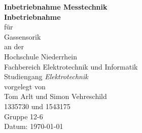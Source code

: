 \begin{titlepage}
    \begin{center}
        {\Large\bf Inbetriebnahme Messtechnik}\\[3cm]

        {\bf Inbetriebnahme}\\
        für \\
        Gassensorik\\[1.5cm]

        an der\\
        Hochschule Niederrhein\\
        Fachbereich Elektrotechnik und Informatik\\
        Studiengang {\em Elektrotechnik}\\[3cm]

        vorgelegt von\\
        Tom Arlt und Simon Vehreschild\\
        1335730 und 1543175\\
        Gruppe 12-6\\[3cm]
        Datum: \today\\[3cm]

    \end{center}
\end{titlepage}

\pagestyle{empty}
\newpage